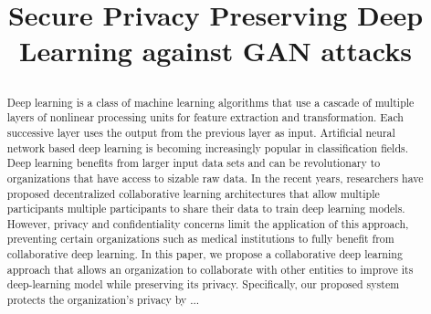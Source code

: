 \documentclass[conference]{IEEEtran}
\begin{document}
\title{{Secure Privacy Preserving Deep Learning against GAN attacks}\\
\author{
\and
{}
}
}
\maketitle

\begin{abstract} 
Deep learning is a class of machine learning algorithms that use a cascade of multiple layers of nonlinear processing units for feature
extraction and transformation. Each successive layer uses the output from the previous layer as input. Artificial neural network based
deep learning is becoming increasingly popular in classification fields. Deep learning benefits from larger input data sets and can be
revolutionary to organizations that have access to sizable raw data. In
the recent years,  researchers have proposed decentralized collaborative learning architectures that allow multiple participants
multiple participants to share their data to train deep learning models. However, privacy and confidentiality concerns limit the
application of this approach, preventing certain organizations such as medical institutions to fully benefit from collaborative deep
learning. 
In this paper, we propose a collaborative deep learning approach that allows an organization to collaborate with other entities
to improve its deep-learning model while preserving its privacy. 
Specifically, our proposed system protects the organization's privacy by ...
\end{abstract}
\end{document}
